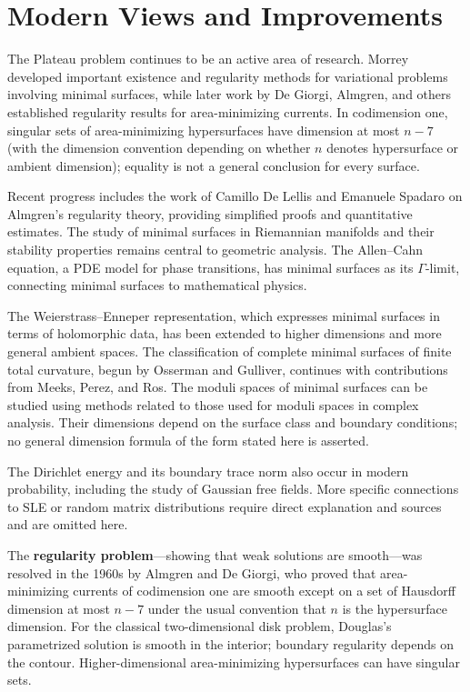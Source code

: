 \section{Modern Views and Improvements}

The Plateau problem continues to be an active area of research. Morrey
developed important existence and regularity methods for variational
problems involving minimal surfaces, while later work by De Giorgi,
Almgren, and others established regularity results for area-minimizing
currents. In codimension one, singular sets of area-minimizing
hypersurfaces have dimension at most $n-7$ (with the dimension
convention depending on whether $n$ denotes hypersurface or ambient
dimension); equality is not a general conclusion for every surface.

Recent progress includes the work of Camillo De Lellis and Emanuele
Spadaro on Almgren's regularity theory, providing simplified proofs and
quantitative estimates. The study of minimal surfaces in Riemannian
manifolds and their stability properties remains central to geometric
analysis. The Allen--Cahn equation, a PDE model for phase transitions,
has minimal surfaces as its $\Gamma$-limit, connecting minimal surfaces
to mathematical physics.

The Weierstrass--Enneper representation, which expresses minimal
surfaces in terms of holomorphic data, has been extended to higher
dimensions and more general ambient spaces. The classification of
complete minimal surfaces of finite total curvature, begun by Osserman
and Gulliver, continues with contributions from Meeks, Perez, and Ros.
The moduli spaces of minimal surfaces can be studied using methods
related to those used for moduli spaces in complex analysis. Their
dimensions depend on the surface class and boundary conditions; no
general dimension formula of the form stated here is asserted.

The Dirichlet energy and its boundary trace norm also occur in modern
probability, including the study of Gaussian free fields. More specific
connections to SLE or random matrix distributions require direct
explanation and sources and are omitted here.

The \textbf{regularity problem}---showing that weak solutions are
smooth---was resolved in the 1960s by Almgren and De Giorgi, who proved
that area-minimizing currents of codimension one are smooth except on a
set of Hausdorff dimension at most $n-7$ under the usual convention
that $n$ is the hypersurface dimension. For the classical two-dimensional
disk problem, Douglas's parametrized solution is smooth in the interior;
boundary regularity depends on the contour. Higher-dimensional
area-minimizing hypersurfaces can have singular sets.

